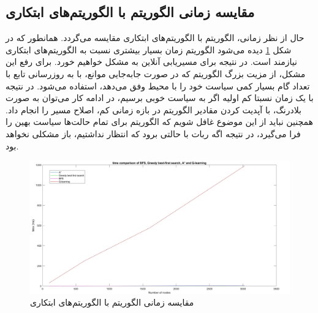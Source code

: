 \subsection{مقایسه زمانی الگوریتم  با الگوریتم‌های ابتکاری}
حال از نظر زمانی، الگوریتم  با الگوریتم‌های ابتکاری مقایسه می‌گردد. همانطور که در شکل \ref{Fig:time Q-learning} دیده می‌شود الگوریتم  زمان بسیار بیشتری نسبت به الگوریتم‌های ابتکاری نیازمند است. در نتیجه برای مسیریابی آنلاین به مشکل خواهیم خورد. برای رفع این مشکل، از مزیت بزرگ الگوریتم  که در صورت جا‌به‌جایی موانع، با به روزرسانی تابع  با تعداد گام بسیار کمی سیاست خود را با محیط وفق می‌دهد، استفاده می‌شود. در نتیجه با یک زمان نسبتا کم اولیه اگر به سیاست خوبی برسیم، در ادامه کار می‌توان به صورت بلادرنگ، با آپدیت کردن مقادیر الگوریتم در بازه زمانی کم، اصلاح مسیر را انجام داد. همچنین نباید از این موضوع غافل شویم که الگوریتم  برای تمام حالت‌ها سیاست بهین را فرا می‌گیرد، در نتیجه اگه ربات با حالتی برود که انتظار نداشتیم، باز مشکلی نخواهد بود.
\begin{figure}[!h]
	\centering
	\includegraphics[scale=0.2]{Images/time Q-learning.jpg}
	\caption{مقایسه زمانی الگوریتم  با الگوریتم‌های ابتکاری}\label{Fig:time Q-learning}
\end{figure}






